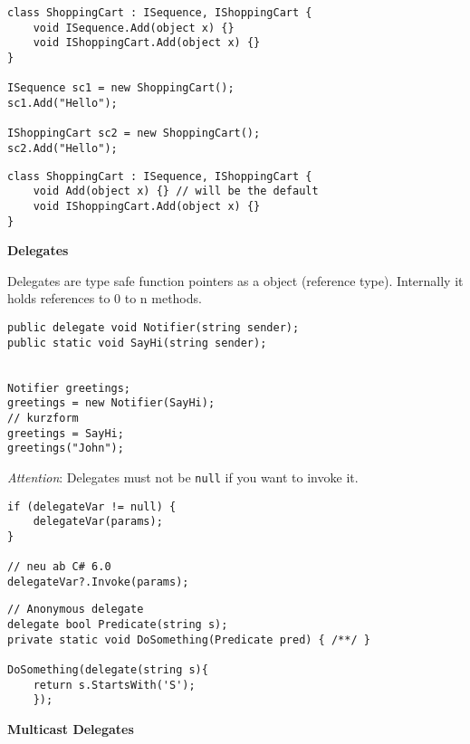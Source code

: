 \documentclass[11pt,twoside,landscape]{article}
\begin{document}
\begin{multicols}{3}
\begin{lstlisting}
class ShoppingCart : ISequence, IShoppingCart {
    void ISequence.Add(object x) {}
    void IShoppingCart.Add(object x) {}
}

ISequence sc1 = new ShoppingCart();
sc1.Add("Hello");

IShoppingCart sc2 = new ShoppingCart();
sc2.Add("Hello");
\end{lstlisting}

\begin{lstlisting}
class ShoppingCart : ISequence, IShoppingCart {
    void Add(object x) {} // will be the default
    void IShoppingCart.Add(object x) {}
}
\end{lstlisting}

\textbf{Delegates}

Delegates are type safe function pointers as a object (reference type).
Internally it holds references to 0 to n methods.

\lstset{language=csharp,label= ,caption= ,captionpos=b,numbers=none}
\begin{lstlisting}
public delegate void Notifier(string sender);
public static void SayHi(string sender);


Notifier greetings;
greetings = new Notifier(SayHi);
// kurzform
greetings = SayHi;
greetings("John");
\end{lstlisting}

\emph{Attention}: Delegates must not be \texttt{null} if you want to invoke it.
\lstset{language=csharp,label= ,caption= ,captionpos=b,numbers=none}
\begin{lstlisting}
if (delegateVar != null) {
    delegateVar(params);
}

// neu ab C# 6.0
delegateVar?.Invoke(params);
\end{lstlisting}

\lstset{language=csharp,label= ,caption= ,captionpos=b,numbers=none}
\begin{lstlisting}
// Anonymous delegate
delegate bool Predicate(string s);
private static void DoSomething(Predicate pred) { /**/ }

DoSomething(delegate(string s){
	return s.StartsWith('S');
    });
\end{lstlisting}


\textbf{Multicast Delegates}


\end{multicols}
\end{document}
